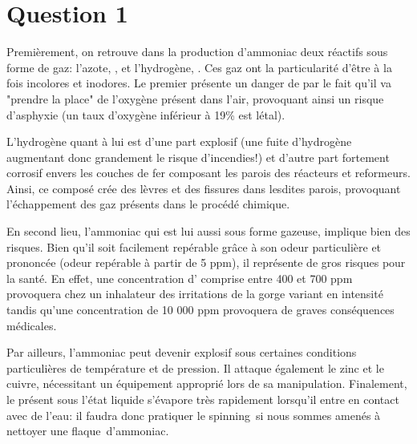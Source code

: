 \documentclass[a4paper,12pt, oneside]{article}
\begin{document}
\section*{Question 1}
Premièrement, on retrouve dans la production d'ammoniac deux réactifs sous forme de gaz: l'azote, , et l'hydrogène, . Ces gaz ont la particularité d'être à la fois incolores et inodores. Le premier présente un danger de par le fait qu'il va "prendre la place" de l'oxygène présent dans l'air, provoquant ainsi un risque d'asphyxie (un taux d'oxygène inférieur à 19\% est létal). 
		
		L'hydrogène quant à lui est d'une part explosif (une fuite d'hydrogène augmentant donc grandement le risque d'incendies!) et d'autre part fortement corrosif envers les couches de fer composant les parois des réacteurs et reformeurs. Ainsi, ce composé crée des lèvres et des fissures dans lesdites parois, provoquant l'échappement des gaz présents dans le procédé chimique.
		
		En second lieu, l'ammoniac qui est lui aussi sous forme gazeuse, implique bien des risques. Bien qu'il soit facilement repérable grâce à son odeur particulière et prononcée (odeur repérable à partir de 5 ppm), il représente de gros risques pour la santé. En effet, une concentration d' comprise entre 400 et 700 ppm provoquera chez un inhalateur des irritations de la gorge variant en intensité tandis qu'une concentration de 10 000 ppm provoquera de graves conséquences médicales.

		Par ailleurs, l'ammoniac peut devenir explosif sous certaines conditions particulières de température et de pression. Il attaque également le zinc et le cuivre, nécessitant un équipement approprié lors de sa manipulation. Finalement, le  présent sous l'état liquide s'évapore très rapidement lorsqu'il entre en contact avec de l'eau: il faudra donc pratiquer le \og spinning\fg \ si nous sommes amenés à nettoyer une \og flaque\fg \ d'ammoniac.
\end{document}
